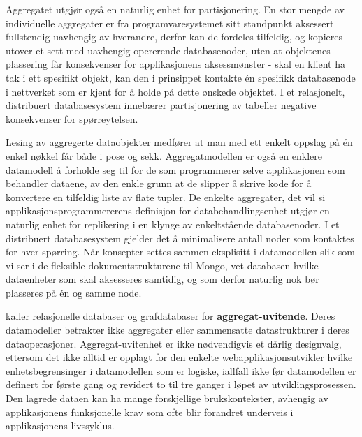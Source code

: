 Aggregatet utgjør også en naturlig enhet for partisjonering. En stor mengde av individuelle aggregater er fra programvaresystemet sitt standpunkt aksessert fullstendig uavhengig av hverandre, derfor kan de fordeles tilfeldig, og kopieres utover et sett med uavhengig opererende databasenoder, uten at objektenes plassering får konsekvenser for applikasjonens aksessmønster - skal en klient ha tak i ett spesifikt objekt, kan den i prinsippet kontakte én spesifikk databasenode i nettverket som er kjent for å holde på dette ønskede objektet. I et relasjonelt, distribuert databasesystem innebærer partisjonering av tabeller negative konsekvenser for spørreytelsen.


Lesing av aggregerte dataobjekter medfører at man med ett enkelt oppslag på én enkel nøkkel får både i pose og sekk. Aggregatmodellen er også en enklere datamodell å forholde seg til for de som programmerer selve applikasjonen som behandler dataene, av den enkle grunn at de slipper å skrive kode for å konvertere en tilfeldig liste av flate tupler. De enkelte aggregater, det vil si applikasjonsprogrammererens definisjon for databehandlingsenhet utgjør en naturlig enhet for replikering i en klynge av enkeltstående databasenoder. I et distribuert databasesystem gjelder det å minimalisere antall noder som kontaktes for hver spørring. Når konsepter settes sammen eksplisitt i datamodellen slik som vi ser i de fleksible dokumentstrukturene til Mongo, vet databasen hvilke dataenheter som skal aksesseres samtidig, og som derfor naturlig nok bør plasseres på én og samme node.

\cite{sadalage2013} kaller relasjonelle databaser og grafdatabaser for \textbf{aggregat-uvitende}. Deres datamodeller betrakter ikke aggregater eller sammensatte datastrukturer i deres dataoperasjoner. Aggregat-uvitenhet er ikke nødvendigvis et dårlig designvalg, ettersom det ikke alltid er opplagt for den enkelte webapplikasjonsutvikler hvilke enhetsbegrensinger i datamodellen som er logiske, iallfall ikke før datamodellen er definert for første gang og revidert to til tre ganger i løpet av utviklingsprosessen. Den lagrede dataen kan ha mange forskjellige brukskontekster, avhengig av applikasjonens funksjonelle krav som ofte blir forandret underveis i applikasjonens livssyklus.


